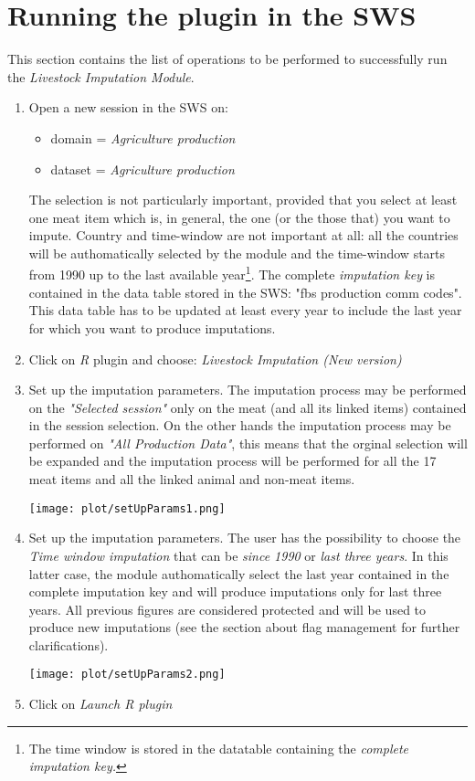 \documentclass[nojss]{jss}
\begin{document}
\section{Running the plugin in the SWS}
This section contains the list of operations to be performed to successfully  run the \textit{Livestock Imputation Module}.

\begin{enumerate}
\item Open a new session in the SWS on:
\begin{itemize}
\item{domain = \textit{Agriculture production}}
\item{dataset = \textit{Agriculture production}}
\end{itemize}

The selection is not particularly important, provided that you select at least one meat item which is, in general, the one (or the those that) you want to impute. Country and time-window are not important at all: all the countries will be authomatically selected by the module and the time-window starts from 1990 up to the last available year\footnote{The time window is stored in the datatable containing the \textit{complete imputation key.}}. The complete \textit{imputation key} is contained in the data table stored in the SWS:
"fbs production comm codes". This data table has to be updated at least every year to include the last year for which you want to produce imputations.
\item Click on \textit{R} plugin and choose: \textit{Livestock Imputation (New version)}
\item Set up the imputation parameters. The imputation process may be performed on the \textit{"Selected session"} only on the meat (and all its linked items) contained in the session selection. On the other hands the imputation process may be performed on \textit{"All Production Data"}, this means that the orginal selection will be expanded and the imputation process will be performed for all the 17 meat items and all the linked animal and non-meat items.

\begin{center}
\texttt{[image: plot/setUpParams1.png]}
\end{center}

\item Set up the imputation parameters. The user has the possibility to choose the \textit{Time window imputation} that can be \textit{since 1990} or \textit{last three years}. In this latter case, the module authomatically select the last year contained in the complete imputation key and will produce imputations only for last three years. All previous figures are considered protected and will be used to produce new imputations (see the section about flag management for further clarifications). 

\begin{center}
\texttt{[image: plot/setUpParams2.png]}
\end{center}

\item Click on \textit{Launch R plugin}
\end{enumerate}
\end{document}
